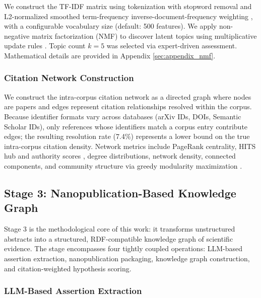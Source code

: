 \documentclass[
  english,
]{article}
\begin{document}
We construct the TF-IDF matrix using tokenization with stopword removal
and L2-normalized smoothed term-frequency inverse-document-frequency
weighting \citep{salton1975vector}, with a configurable vocabulary size
(default: 500 features). We apply non-negative matrix factorization
(NMF) to discover latent topics using multiplicative update rules
\citep{lee1999nmf}. Topic count \(k=5\) was selected via expert-driven
assessment. Mathematical details are provided in Appendix
\ref{sec:appendix_nmf}.

\subsubsection{Citation Network
Construction}\label{citation-network-construction}

We construct the intra-corpus citation network as a directed graph where
nodes are papers and edges represent citation relationships resolved
within the corpus. Because identifier formats vary across databases
(arXiv IDs, DOIs, Semantic Scholar IDs), only references whose
identifiers match a corpus entry contribute edges; the resulting
resolution rate (7.4\%) represents a lower bound on the true
intra-corpus citation density. Network metrics include PageRank
centrality, HITS hub and authority scores
\citep{kleinberg1999authoritative}, degree distributions, network
density, connected components, and community structure via greedy
modularity maximization \citep{clauset2004finding}.

\newpage

\subsection{\texorpdfstring{Stage 3: Nanopublication-Based Knowledge
Graph
\label{sec:methods_kg}}{Stage 3: Nanopublication-Based Knowledge Graph}}\label{stage-3-nanopublication-based-knowledge-graph}

Stage 3 is the methodological core of this work: it transforms
unstructured abstracts into a structured, RDF-compatible knowledge graph
of scientific evidence. The stage encompasses four tightly coupled
operations: LLM-based assertion extraction, nanopublication packaging,
knowledge graph construction, and citation-weighted hypothesis scoring.

\subsubsection{LLM-Based Assertion
Extraction}\label{llm-based-assertion-extraction}
\end{document}
